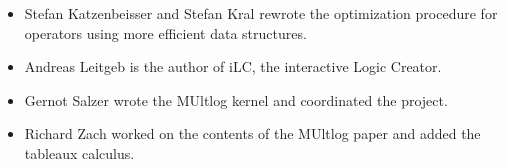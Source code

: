\documentclass[]{article}
\providecommand{\tightlist}{%
  \setlength{\itemsep}{0pt}\setlength{\parskip}{0pt}}
\begin{document}
\begin{itemize}
\tightlist
\item
  Stefan Katzenbeisser and Stefan Kral rewrote the optimization
  procedure for operators using more efficient data structures.
\item
  Andreas Leitgeb is the author of iLC, the interactive Logic Creator.
\item
  Gernot Salzer wrote the MUltlog kernel and coordinated the project.
\item
  Richard Zach worked on the contents of the MUltlog paper and added
  the tableaux calculus.
\end{itemize}

\end{document}
